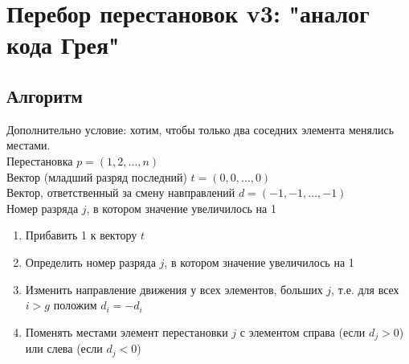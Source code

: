 \documentclass[main]{subfiles}
\begin{document}
\section{Перебор перестановок v3: "аналог кода Грея"}
\subsection{Алгоритм}
Дополнительно условие: хотим, чтобы только два соседних элемента менялись 
местами. \\
Перестановка $p = (1, 2, \ldots, n)$ \\
Вектор (младший разряд последний) $t = (0, 0, \ldots, 0)$ \\
Вектор, ответственный за смену навправлений $d = (-1, -1, \ldots, -1)$ \\
Номер разряда $j$, в котором значение увеличилось на 1
\begin{enumerate}
    \item Прибавить 1 к вектору $t$
    \item Определить номер разряда $j$, в котором значение увеличилось на 1
    \item Изменить направление движения у всех элементов, больших $j$, т.е.
для всех $i > g$ положим $d_i = -d_i$
    \item Поменять местами элемент перестановки $j$ с элементом справа
(если $d_j > 0$) или слева (если $d_j < 0$)
\end{enumerate}
\end{document}
